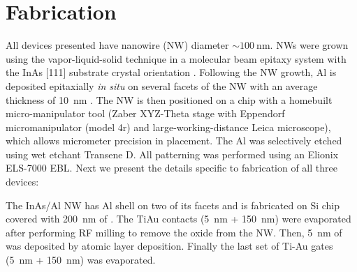 \clearpage
\section{Fabrication}
\label{sec:majo_D}

All devices presented have nanowire (NW) diameter  $\sim \SI{100}{\nano\meter}$. NWs were grown using the vapor-liquid-solid technique in a molecular beam epitaxy system with the InAs [111] substrate crystal orientation \cite{Krogstrup}. Following the NW growth, Al is deposited epitaxially \textit{in situ} on several facets of the NW with an average thickness of \SI{10}{\nano\meter} \cite{Krogstrup,MT1}. The NW is then positioned on a chip with a homebuilt micro-manipulator tool (Zaber XYZ-Theta stage with Eppendorf micromanipulator (model 4r) and large-working-distance Leica microscope), which allows micrometer precision in placement. The Al was selectively etched using wet etchant Transene D. All patterning was performed using an Elionix ELS-7000 EBL. Next we present the details specific to fabrication of all three devices:

The InAs/Al NW has Al shell on two of its facets and is fabricated on Si chip covered with \SI{200}{\nano\meter}  of . The TiAu contacts (\SI{5}{\nano\meter} + \SI{150}{\nano\meter}) were evaporated after performing RF milling to remove the oxide from the NW. Then, \SI{5}{\nano\meter} of  was deposited by atomic layer deposition. Finally the last set of Ti-Au gates (\SI{5}{\nano\meter} + \SI{150}{\nano\meter}) was evaporated.